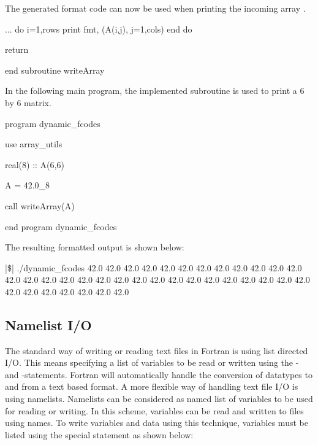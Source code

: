 The generated format code can now be used when printing the incoming array .

\begin{fortrancodeenv}
	...
	do i=1,rows
		print fmt, (A(i,j), j=1,cols)
	end do
		
	return
	
end subroutine writeArray
\end{fortrancodeenv}

In the following main program, the implemented  subroutine is used to print a 6 by 6 matrix.

\begin{fortrancodeenv}
program dynamic_fcodes

	use array_utils

	real(8) :: A(6,6)
	
	A = 42.0_8
	
	call writeArray(A)
	
end program dynamic_fcodes
\end{fortrancodeenv}

The resulting formatted output is shown below:

\cmdmode

\begin{fortrancodeenv}
|\$| ./dynamic_fcodes 
42.0    42.0    42.0    42.0    42.0    42.0    
42.0    42.0    42.0    42.0    42.0    42.0    
42.0    42.0    42.0    42.0    42.0    42.0    
42.0    42.0    42.0    42.0    42.0    42.0    
42.0    42.0    42.0    42.0    42.0    42.0    
42.0    42.0    42.0    42.0    42.0    42.0    
\end{fortrancodeenv}

\fmode

\subsection{Namelist I/O}

The standard way of writing or reading text files in Fortran is using list directed I/O. This means specifying a list of variables to be read or written using the - and -statements. Fortran will automatically handle the conversion of datatypes to and from a text based format. A more flexible way of handling text file I/O is using namelists. Namelists can be considered as named list of variables to be used for reading or writing. In this scheme, variables can be read and written to files using names. To write variables and data using this technique, variables must be listed using the special  statement as shown below:

